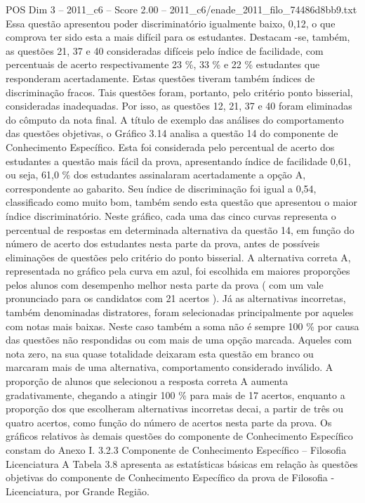 \begin{textsample}{POS Dim 3 – 2011\_c6 – Score 2.00 – 2011\_c6/enade\_2011\_filo\_74486d8bb9.txt}
Essa questão apresentou poder discriminatório igualmente baixo, 0,12, o que comprova ter sido esta a mais difícil para os estudantes.
Destacam -se, também, as questões 21, 37 e 40 consideradas difíceis pelo índice de facilidade, com percentuais de acerto respectivamente 23 \%, 33 \% e 22 \% estudantes que responderam acertadamente.
Estas questões tiveram também índices de discriminação fracos.
Tais questões foram, portanto, pelo critério ponto bisserial, consideradas inadequadas.
Por isso, as questões 12, 21, 37 e 40 foram eliminadas do cômputo da nota final.
A título de exemplo das análises do comportamento das questões objetivas, o Gráfico 3.14 analisa a questão 14 do componente de Conhecimento Específico.
Esta foi considerada pelo percentual de acerto dos estudantes a questão mais fácil da prova, apresentando índice de facilidade 0,61, ou seja, 61,0 \% dos estudantes assinalaram acertadamente a opção A, correspondente ao gabarito.
Seu índice de discriminação foi igual a 0,54, classificado como muito bom, também sendo esta questão que apresentou o maior índice discriminatório.
Neste gráfico, cada uma das cinco curvas representa o percentual de respostas em determinada alternativa da questão 14, em função do número de acerto dos estudantes nesta parte da prova, antes de possíveis eliminações de questões pelo critério do ponto bisserial.
A alternativa correta A, representada no gráfico pela curva em azul, foi escolhida em maiores proporções pelos alunos com desempenho melhor nesta parte da prova ( com um vale pronunciado para os candidatos com 21 acertos ).
Já as alternativas incorretas, também denominadas distratores, foram selecionadas principalmente por aqueles com notas mais baixas.
Neste caso também a soma não é sempre 100 \% por causa das questões não respondidas ou com mais de uma opção marcada.
Aqueles com nota zero, na sua quase totalidade deixaram esta questão em branco ou marcaram mais de uma alternativa, comportamento considerado inválido.
A proporção de alunos que selecionou a resposta correta A aumenta gradativamente, chegando a atingir 100 \% para mais de 17 acertos, enquanto a proporção dos que escolheram alternativas incorretas decai, a partir de três ou quatro acertos, como função do número de acertos nesta parte da prova.
Os gráficos relativos às demais questões do componente de Conhecimento Específico constam do Anexo I. 3.2.3 Componente de Conhecimento Específico – Filosofia Licenciatura A Tabela 3.8 apresenta as estatísticas básicas em relação às questões objetivas do componente de Conhecimento Específico da prova de Filosofia - Licenciatura, por Grande Região.

\end{textsample}
